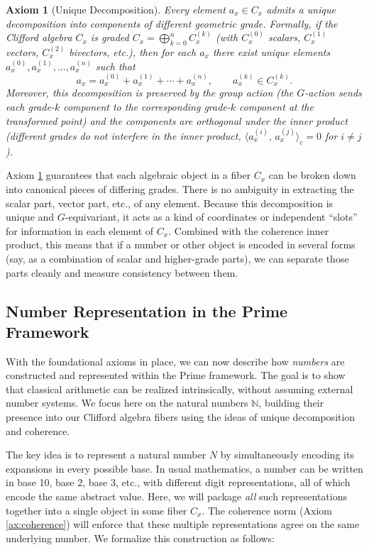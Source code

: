 \documentclass[11pt]{article}
\newtheorem{axiom}{Axiom}
\begin{document}
\begin{axiom}[Unique Decomposition]\label{ax:decomposition}
Every element $a_x \in C_x$ admits a unique decomposition into components of different geometric grade. Formally, if the Clifford algebra $C_x$ is graded $C_x = \bigoplus_{k=0}^n C_x^{(k)}$ (with $C_x^{(0)}$ scalars, $C_x^{(1)}$ vectors, $C_x^{(2)}$ bivectors, etc.), then for each $a_x$ there exist unique elements $a_x^{(0)}, a_x^{(1)}, \dots, a_x^{(n)}$ such that 
\[ a_x = a_x^{(0)} + a_x^{(1)} + \cdots + a_x^{(n)}, \qquad a_x^{(k)} \in C_x^{(k)}. \] 
Moreover, this decomposition is preserved by the group action (the $G$-action sends each grade-$k$ component to the corresponding grade-$k$ component at the transformed point) and the components are orthogonal under the inner product (different grades do not interfere in the inner product, $\langle a_x^{(i)},\,a_x^{(j)}\rangle_c = 0$ for $i\neq j$).
\end{axiom}

Axiom \ref{ax:decomposition} guarantees that each algebraic object in a fiber $C_x$ can be broken down into canonical pieces of differing grades. There is no ambiguity in extracting the scalar part, vector part, etc., of any element. Because this decomposition is unique and $G$-equivariant, it acts as a kind of coordinates or independent “slots” for information in each element of $C_x$. Combined with the coherence inner product, this means that if a number or other object is encoded in several forms (say, as a combination of scalar and higher-grade parts), we can separate those parts cleanly and measure consistency between them.

\subsection*{Number Representation in the Prime Framework}

With the foundational axioms in place, we can now describe how \emph{numbers} are constructed and represented within the Prime framework. The goal is to show that classical arithmetic can be realized intrinsically, without assuming external number systems. We focus here on the natural numbers $\mathbb{N}$, building their presence into our Clifford algebra fibers using the ideas of unique decomposition and coherence.

The key idea is to represent a natural number $N$ by simultaneously encoding its expansions in every possible base. In usual mathematics, a number can be written in base 10, base 2, base 3, etc., with different digit representations, all of which encode the same abstract value. Here, we will package \emph{all} such representations together into a single object in some fiber $C_x$. The coherence norm (Axiom \ref{ax:coherence}) will enforce that these multiple representations agree on the same underlying number. We formalize this construction as follows:
\end{document}
